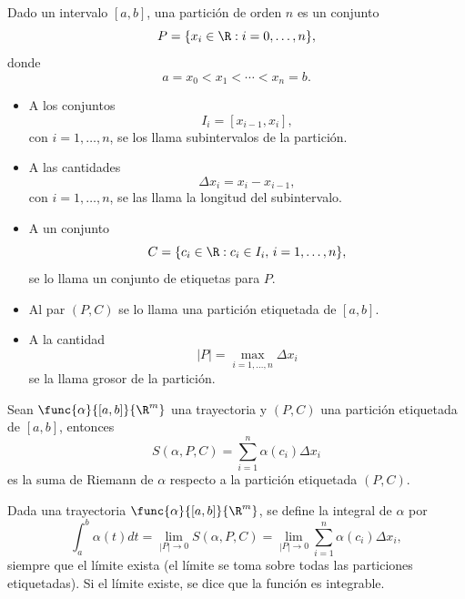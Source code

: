 \documentclass[a4,11pt]{aleph-notas}
\begin{document}
\begin{defi}
    Dado un intervalo $[a,b]$, una partición de orden $n$ es un conjunto
    \[
        P=\{x_i\in\R: i=0,\ldots,n\},
    \]
    donde
    \[
        a=x_0<x_1<\cdots<x_n=b.
    \]
    \begin{itemize}
    \item 
        A los conjuntos
        \[
            I_i=[x_{i-1},x_i],
        \]
        con $i=1,\ldots,n$, se los llama subintervalos de la partición.
    \item 
        A las cantidades
        \[
            \Delta x_i = x_i - x_{i-1},
        \]
        con $i=1,\ldots,n$, se las llama la longitud del subintervalo.
    \item 
        A un conjunto
        \[
            C=\{c_i\in\R : c_i\in I_i, \, i=1,\ldots,n\},
        \]
        se lo llama un conjunto de etiquetas para $P$.
    \item
        Al par $(P,C)$ se lo llama una partición etiquetada de $[a,b]$.
    \item A la cantidad
        \[
            |P|=\max_{i=1,\ldots,n}{\Delta x_i}
        \]
        se la llama grosor de la partición.
    \end{itemize}
\end{defi}

\begin{defi}
    Sean $\func{\alpha}{[a,b]}{\R^m}$ una trayectoria y $(P,C)$ una partición etiquetada de $[a,b]$, entonces
    \[
        S(\alpha,P,C)=\sum_{i=1}^n \alpha(c_i)\Delta x_i
    \]
    es la suma de Riemann de $\alpha$ respecto a la partición etiquetada $(P,C)$.
\end{defi}

\begin{prop}
    Dada una trayectoria $\func{\alpha}{[a,b]}{\R^m}$, se define la integral de $\alpha$ por
    \[
        \int_a^b \alpha(t)dt = \lim_{|P|\to 0} S(\alpha,P,C) = \lim_{|P|\to 0} \sum_{i=1}^n \alpha(c_i)\Delta x_i,
    \]
    siempre que el límite exista (el límite se toma sobre todas las particiones etiquetadas). Si el límite existe, se dice que la función es integrable.
\end{prop}
\end{document}
